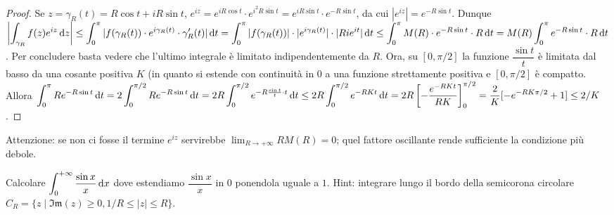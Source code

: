 \begin{proof}
  Se $z=\gamma_R(t)=R\cos{t}+iR\sin{t}$, $e^{iz}=e^{iR\cos{t}}\cdot e^{i^2R\sin{t}}=e^{iR\sin{t}}\cdot e^{-R\sin{t}}$, da cui $|e^{iz}|=e^{-R\sin{t}}$.
  Dunque $\displaystyle \left| \int_{\gamma_R} f(z)e^{iz}\mathop{}\!\mathrm{d} z\right| \le \int_0^\pi | f(\gamma_R(t))\cdot e^{i\gamma_R(t)}\cdot \gamma_R'(t)|\mathop{}\!\mathrm{d} t=\int_0^\pi |f(\gamma_R(t))|\cdot |e^{i\gamma_R(t)}|\cdot |Ri e^{it}| \mathop{}\!\mathrm{d} t \le \int_0^\pi M(R) \cdot e^{-R\sin{t}} \cdot R \mathop{}\!\mathrm{d} t=M(R)\int_0^\pi e^{-R\sin{t}}\cdot R \mathop{}\!\mathrm{d} t$.
  Per concludere basta vedere che l'ultimo integrale è limitato indipendentemente da $R$. Ora, su $[0,\pi/2]$ la funzione $\dfrac{\sin{t}}{t}$ è limitata dal basso da una cosante positiva $K$ (in quanto si estende con continuità in $0$ a una funzione strettamente positiva e $[0,\pi/2]$ è compatto. Allora $\displaystyle \int_0^\pi Re^{-R\sin{t}} \mathop{}\!\mathrm{d} t=2 \int_0^{\pi/2} Re^{-R\sin{t}}\mathop{}\!\mathrm{d} t=2R \int_0^{\pi/2} e^{-R\frac{\sin{t}}{t}\cdot t} \mathop{}\!\mathrm{d} t \le 2R \int_0^{\pi/2} e^{-RKt}\mathop{}\!\mathrm{d} t=2R\left[-\frac{e^{-RKt}}{RK}\right]_0^{\pi/2}=\frac{2}{K}[-e^{-RK\pi/2}+1] \le 2/K$.
\end{proof}

Attenzione: se non ci fosse il termine $e^{iz}$ servirebbe $\displaystyle \lim_{R \longrightarrow +\infty} RM(R)=0$; quel fattore oscillante rende sufficiente la condizione più debole. \marginpar\warningsign

\begin{exc}
  Calcolare $\displaystyle \int_0^{+\infty} \frac{\sin{x}}{x} \mathop{}\!\mathrm{d} x$ dove estendiamo $\dfrac{\sin{x}}{x}$ in $0$ ponendola uguale a $1$. Hint: integrare lungo il bordo della semicorona circolare $C_R=\{z \mid \mathfrak{Im}(z) \ge 0, 1/R \le |z| \le R\}$.
\end{exc}
